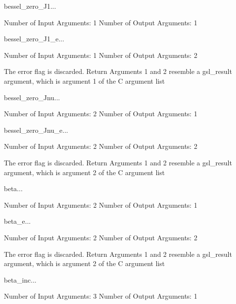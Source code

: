 \begin{funcdesc}{bessel_zero_J1}{...}

    Number of Input  Arguments:  1
    Number of Output Arguments:  1
\end{funcdesc}

\begin{funcdesc}{bessel_zero_J1_e}{...}

    Number of Input  Arguments:  1
    Number of Output Arguments:  2

The error flag is discarded.
Return Arguments 1 and 2 resemble a gsl_result argument,
	which is  argument 1 of the C argument list

\end{funcdesc}

\begin{funcdesc}{bessel_zero_Jnu}{...}

    Number of Input  Arguments:  2
    Number of Output Arguments:  1
\end{funcdesc}

\begin{funcdesc}{bessel_zero_Jnu_e}{...}

    Number of Input  Arguments:  2
    Number of Output Arguments:  2

The error flag is discarded.
Return Arguments 1 and 2 resemble a gsl_result argument,
	which is  argument 2 of the C argument list

\end{funcdesc}

\begin{funcdesc}{beta}{...}

    Number of Input  Arguments:  2
    Number of Output Arguments:  1
\end{funcdesc}

\begin{funcdesc}{beta_e}{...}

    Number of Input  Arguments:  2
    Number of Output Arguments:  2

The error flag is discarded.
Return Arguments 1 and 2 resemble a gsl_result argument,
	which is  argument 2 of the C argument list

\end{funcdesc}

\begin{funcdesc}{beta_inc}{...}

    Number of Input  Arguments:  3
    Number of Output Arguments:  1
\end{funcdesc}


